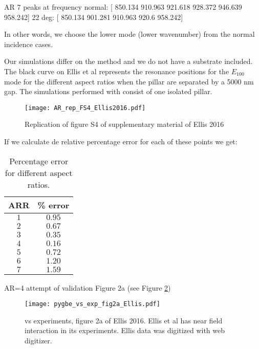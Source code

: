 AR 7 peaks at frequency
normal: [ {\color{green}850.134} 910.963 921.618 928.372 946.639 958.242]
22 deg: [ {\color{green}850.134} 901.281 910.963 920.6 958.242]

In other words, we choose the lower mode (lower wavenumber) from the normal 
incidence cases.

Our simulations differ on the method and we do not have a substrate included. The black curve on 
Ellis et al \cite{ellis2016} represents the resonance positions for the $E_{100}$ mode for the different 
aspect ratios when the pillar are separated by a 5000 nm gap. The simulations performed with \pygbe 
consist of one isolated pillar.

\begin{figure}
    \centering
    \texttt{[image: AR\_rep\_FS4\_Ellis2016.pdf]} 
    \caption{Replication of figure S4 of supplementary material of Ellis 2016}
    \label{fig:rep_FS4_ellis}
 \end{figure}

 If we calculate de relative percentage error for each of these points we get:
 
 \begin{table}
    \centering
    \caption{\label{table:err_AR} Percentage error for different aspect ratios.} 
    \begin{tabular}{c c}
    \hline%
    ARR & \% error \\
    \hline%
     $1$ & $0.95$ \\
     $2$ & $0.67$ \\
     $3$ & $0.35$ \\
     $4$ & $0.16$ \\
     $5$ & $0.72$ \\
     $6$ & $1.20$ \\
     $7$ & $1.59$ \\
    \hline%
    \end{tabular}
\end{table}


\pygbe AR=4 attempt of validation Figure 2a (see Figure \ref{fig:pygbe_vs_exp_2a})

\begin{figure}
    \centering
    \texttt{[image: pygbe\_vs\_exp\_fig2a\_Ellis.pdf]} 
    \caption{\pygbe vs experiments, figure 2a of Ellis 2016. Ellis et al 
    has near field interaction in its experiments. Ellis data was digitized
    with web digitizer.}
    \label{fig:pygbe_vs_exp_2a}
 \end{figure}

